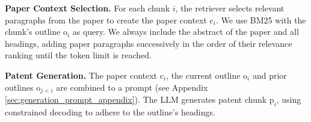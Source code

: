 \noindent\textbf{Paper Context Selection. }
For each chunk $i$, the retriever selects relevant paragraphs from the paper to create the paper context $\text{c}_i$.
We use BM25 \cite{robertsonProbabilisticRelevanceFramework2009} with the chunk's outline $\text{o}_i$ as query.
We always include the abstract of the paper and all headings, adding paper paragraphs successively %
in the order of their relevance ranking until the token limit is reached.


\noindent\textbf{Patent Generation. } 
The paper context $\text{c}_i$, the current outline $\text{o}_i$ and prior outlines $\text{o}_{j<i}$ are combined to a prompt (see Appendix \ref{sec:generation_prompt_appendix}). 
The LLM generates patent chunk $\text{p}_i$, using constrained decoding to adhere to the outline's headings.
